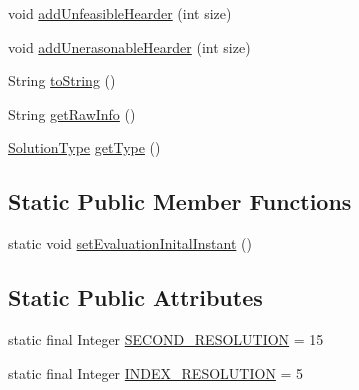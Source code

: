 \begin{DoxyCompactItemize}
\item 
void \hyperlink{classit_1_1emarolab_1_1cagg_1_1core_1_1evaluation_1_1interfacing_1_1GuiEvaluationInterface_1_1EvaluatingInfoPrimitive_a2d55691ca0e34ed4e8833b2684d72eca}{add\-Unfeasible\-Hearder} (int size)
\item 
void \hyperlink{classit_1_1emarolab_1_1cagg_1_1core_1_1evaluation_1_1interfacing_1_1GuiEvaluationInterface_1_1EvaluatingInfoPrimitive_a73a60182b3db8929e600dfdbb518cf99}{add\-Unerasonable\-Hearder} (int size)
\item 
String \hyperlink{classit_1_1emarolab_1_1cagg_1_1core_1_1evaluation_1_1interfacing_1_1GuiEvaluationInterface_1_1EvaluatingInfoPrimitive_a54546bd8b0b4f78f8d2a5dd0c18be5be}{to\-String} ()
\item 
String \hyperlink{classit_1_1emarolab_1_1cagg_1_1core_1_1evaluation_1_1interfacing_1_1GuiEvaluationInterface_1_1EvaluatingInfoPrimitive_afdd37273b46ed1bd151557623c975569}{get\-Raw\-Info} ()
\item 
\hyperlink{enumit_1_1emarolab_1_1cagg_1_1core_1_1evaluation_1_1interfacing_1_1GuiEvaluationInterface_1_1SolutionType}{Solution\-Type} \hyperlink{classit_1_1emarolab_1_1cagg_1_1core_1_1evaluation_1_1interfacing_1_1GuiEvaluationInterface_1_1EvaluatingInfoPrimitive_a009ab9c843394292ae42ef9cc36076e9}{get\-Type} ()
\end{DoxyCompactItemize}
\subsection*{Static Public Member Functions}
\begin{DoxyCompactItemize}
\item 
static void \hyperlink{classit_1_1emarolab_1_1cagg_1_1core_1_1evaluation_1_1interfacing_1_1GuiEvaluationInterface_1_1EvaluatingInfoPrimitive_a2651221a340df6343f5d86c7061aa034}{set\-Evaluation\-Inital\-Instant} ()
\end{DoxyCompactItemize}
\subsection*{Static Public Attributes}
\begin{DoxyCompactItemize}
\item 
static final Integer \hyperlink{classit_1_1emarolab_1_1cagg_1_1core_1_1evaluation_1_1interfacing_1_1GuiEvaluationInterface_1_1EvaluatingInfoPrimitive_a634c8a5b9c7a3e91fa2a37f20071bcee}{S\-E\-C\-O\-N\-D\-\_\-\-R\-E\-S\-O\-L\-U\-T\-I\-O\-N} = 15
\item 
static final Integer \hyperlink{classit_1_1emarolab_1_1cagg_1_1core_1_1evaluation_1_1interfacing_1_1GuiEvaluationInterface_1_1EvaluatingInfoPrimitive_a3191c2cabdcaedde5ecddc5576a0012f}{I\-N\-D\-E\-X\-\_\-\-R\-E\-S\-O\-L\-U\-T\-I\-O\-N} = 5
\end{DoxyCompactItemize}
